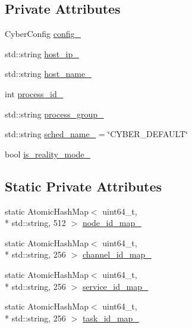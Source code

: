 \subsection*{Private Attributes}
\begin{DoxyCompactItemize}
\item 
Cyber\-Config \hyperlink{classapollo_1_1cyber_1_1common_1_1GlobalData_a8efeddcd2e684e46bac9c51c6090a7fb}{config\-\_\-}
\item 
std\-::string \hyperlink{classapollo_1_1cyber_1_1common_1_1GlobalData_aef658f6aa36b7d7ac0cb38136daf7cce}{host\-\_\-ip\-\_\-}
\item 
std\-::string \hyperlink{classapollo_1_1cyber_1_1common_1_1GlobalData_a5f6e56d8227a41b2ee57b5ea8c5f2746}{host\-\_\-name\-\_\-}
\item 
int \hyperlink{classapollo_1_1cyber_1_1common_1_1GlobalData_a5e587220e06a0b2d7e6dc92edf39b2c3}{process\-\_\-id\-\_\-}
\item 
std\-::string \hyperlink{classapollo_1_1cyber_1_1common_1_1GlobalData_acad7df736c167ed6c4a948fab5f6c294}{process\-\_\-group\-\_\-}
\item 
std\-::string \hyperlink{classapollo_1_1cyber_1_1common_1_1GlobalData_a907005048a52bc169827433783e14463}{sched\-\_\-name\-\_\-} = \char`\"{}C\-Y\-B\-E\-R\-\_\-\-D\-E\-F\-A\-U\-L\-T\char`\"{}
\item 
bool \hyperlink{classapollo_1_1cyber_1_1common_1_1GlobalData_aab8e6ddd2ca6b1633cb97cd4df6ee8ba}{is\-\_\-reality\-\_\-mode\-\_\-}
\end{DoxyCompactItemize}
\subsection*{Static Private Attributes}
\begin{DoxyCompactItemize}
\item 
static Atomic\-Hash\-Map$<$ uint64\-\_\-t, \\*
std\-::string, 512 $>$ \hyperlink{classapollo_1_1cyber_1_1common_1_1GlobalData_a8cfa861e6f13217ed4d53c59f5245a38}{node\-\_\-id\-\_\-map\-\_\-}
\item 
static Atomic\-Hash\-Map$<$ uint64\-\_\-t, \\*
std\-::string, 256 $>$ \hyperlink{classapollo_1_1cyber_1_1common_1_1GlobalData_ad28c90146805267fce1420eb2d146151}{channel\-\_\-id\-\_\-map\-\_\-}
\item 
static Atomic\-Hash\-Map$<$ uint64\-\_\-t, \\*
std\-::string, 256 $>$ \hyperlink{classapollo_1_1cyber_1_1common_1_1GlobalData_aa275354102633f341e7b639afcf90b2d}{service\-\_\-id\-\_\-map\-\_\-}
\item 
static Atomic\-Hash\-Map$<$ uint64\-\_\-t, \\*
std\-::string, 256 $>$ \hyperlink{classapollo_1_1cyber_1_1common_1_1GlobalData_adac61bb03ae049915507e3f3e9077790}{task\-\_\-id\-\_\-map\-\_\-}
\end{DoxyCompactItemize}


